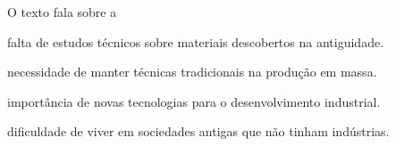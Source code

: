O texto fala sobre a

\begin{escolha}
\item falta de estudos técnicos sobre materiais descobertos na antiguidade.

\item necessidade de manter técnicas tradicionais na produção em massa.

\item importância de novas tecnologias para o desenvolvimento industrial.

\item dificuldade de viver em sociedades antigas que não tinham indústrias.
\end{escolha}


\blankpage